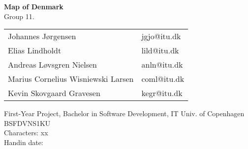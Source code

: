 \documentclass[a4paper,12pt]{article}
\begin{document}
\begin{center}
    \huge{\textbf{Map of Denmark}}\\
    \Large{Group 11.}\\
  \end{center}
    \begin{center}
      \begin{tabular}{p{2.85in}|p{2.85in}}
         Johannes Jørgensen & jgjo@itu.dk  \\   
         Elias Lindholdt & lild@itu.dk  \\
         Andreas Løvsgren Nielsen & anln@itu.dk\\
         Marius Cornelius Wisniewski Larsen & coml@itu.dk \\
         Kevin Skovgaard Gravesen & kegr@itu.dk \\    
         \hline
      \end{tabular}
   \end{center}
   \vspace{0.5cm}
  \begin{center}
    \vspace{0.5cm}
    First-Year Project, Bachelor in Software Development, IT Univ. of Copenhagen\\
    BSFDVNS1KU\\
    \vspace{0.5cm}
    Characters: xx \\
    Handin date: \date{\today} 
  \end{center}

\newpage
\pagestyle{fancy}
\fancyhead{} %
\fancyfoot{} %
\fancyfoot[LE,RO]{\thepage}
\renewcommand*\contentsname{Table of Contents}
\tableofcontents
\newpage



\printbibliography[title={References}]
\end{document}
